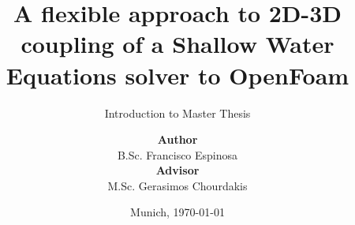 %
% 
% 
%
\newcommand{\shiftedframetitle}[1]{\frametitle{\\\vspace{-2cm}#1}\vspace{0.5cm}}





\newcommand{\Datum}{\today}

\renewcommand{\PraesentationFusszeileZusatz}{| Introduction to Master Thesis}

\title{A flexible approach to 2D-3D coupling of a Shallow Water Equations solver to OpenFoam}
\subtitle{Introduction to Master Thesis}
\author{\vspace{0.5cm}\textbf{Author}\\ B.Sc. Francisco Espinosa \\[0.2cm] \textbf{Advisor} \\ M.Sc. Gerasimos Chourdakis}
\date[\Datum]{Munich, \Datum}
\subject{Introduction to Master Thesis}




